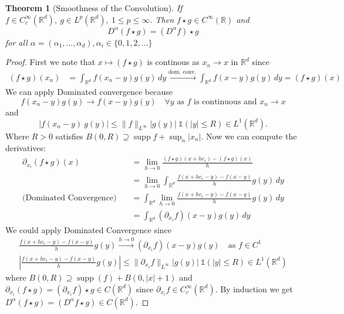 \documentclass{report}
\theoremstyle{tommy}
\newtheorem{thm}[defn]{Theorem}
\newcommand{\supp}{\operatorname{supp}}
\begin{document}
  \begin{thm}[Smoothness of the Convolution]
    If \(f \in C_c^\infty(\mathbb{R}^d),\ g \in L^p(\mathbb{R}^d),\ 1 \le p \le \infty\). Then \(f \star g \in C^\infty(\mathbb{R})\) and 
    \[D^\alpha (f\star g) = (D^\alpha f) \star g\]
    for all \(\alpha = (\alpha_1, \dots, \alpha_d), \alpha_i \in \{0, 1, 2, \dots\}\)
  \end{thm}

  \begin{proof}
    First we note that \(x \mapsto (f \star g)\) is continous as \(x_n \to x\) in \(\mathbb{R}^d\) since
    \begin{align*}
      (f \star g)(x_n) 
      &= \int_{\mathbb{R}^d} f(x_n - y) g(y) \, dy \xrightarrow{\text{dom. conv.}} \int_{\mathbb{R}^d} f(x-y) g(y) \, dy = (f \star g)(x)
    \end{align*}
    We can apply Dominated convergence because 
      \[f(x_n - y)g(y) \to f(x-y)g(y)\quad  \forall y \text{ as \(f\) is continuous and } x_n \to x\]
      and
      \[|f(x_n -y)\ g(y)| \le \|f\|_{L^\infty} |g(y)| \ \mathbb{1}(|y| \le R) \in L^1(\mathbb{R}^d).\]
      Where \(R > 0\) satisfies \(B(0, R) \supseteq \supp f + \sup_n |x_n|\).
      Now we can compute the derivatives:
      \begin{align*}
        \partial_{x_i} (f \star g)(x)
        &= \lim_{h \to 0} \frac{(f \star g)(x + he_i) - (f \star g)(x)}{h} \\
        &= \lim_{h \to 0} \int_{\mathbb{R}^d} \frac{f(x + he_i - y) - f(x-y)}{h} g(y) \, dy \\
        \text{(Dominated Convergence)} \quad &= \int_{\mathbb{R}^d}\lim_{h \to 0} \frac{f(x + he_i - y) - f(x-y)}{h} g(y) \, dy \\
        &= \int_{\mathbb{R}^d} (\partial_{x_i} f)(x-y) g(y) \, dy
      \end{align*}
      We could apply Dominated Convergence since
      \begin{align*}
        \frac{f(x + he_i -y) - f(x-y)}{h} g(y) \xrightarrow{h \to 0} (\partial_{x_i} f) (x-y) g(y) \quad \text{as \(f \in C^1\)} \\
        \left| \frac{f(x + h e_i -y) - f(x-y)}{h} g(y) \right| \le \| \partial_{x_i} f \|_{L^\infty} |g(y)| \ \mathbb{1}(|y| \le R) \in L^1(\mathbb{R}^d)
      \end{align*}
      where \(B(0, R) \supseteq \supp(f) + B(0, |x| + 1)\)
      and \(\partial_{x_i} (f \star g) = (\partial_{x_i} f) \star g \in C(\mathbb{R}^d)\) since \(\partial_{x_i} f \in C_c^\infty(\mathbb{R}^d)\).
      By induction we get \(D^\alpha (f \star g) = (D^\alpha f \star g) \in C(\mathbb{R}^d)\).
  \end{proof}
\end{document}
